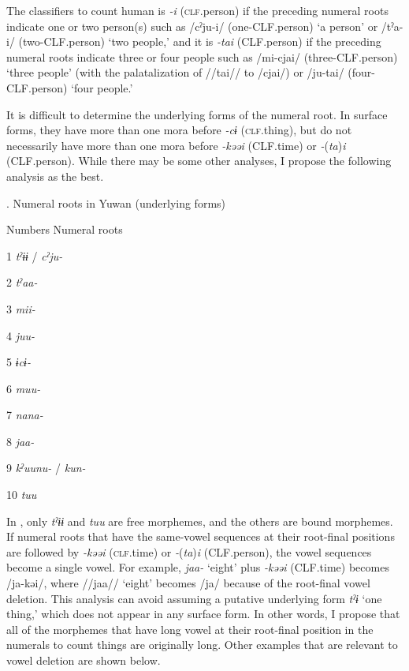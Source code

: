   The classifiers to count human is \textit{{}-i} (\textsc{clf}.person) if the preceding numeral roots indicate one or two person(s) such as /cˀju-i/ (one-CLF.person) ‘a person’ or /tˀa-i/ (two-CLF.person) ‘two people,’ and it is \textit{{}-tai} (CLF.person) if the preceding numeral roots indicate three or four people such as /mi-cjai/ (three-CLF.person) ‘three people’ (with the palatalization of //tai// to /cjai/) or /ju-tai/ (four-CLF.person) ‘four people.’

  It is difficult to determine the underlying forms of the numeral root. In surface forms, they have more than one mora before \textit{{}-cɨ} (\textsc{clf}.thing), but do not necessarily have more than one mora before \textit{{}-kəəi} (CLF.time) or \textit{{}-}(\textit{ta})\textit{i} (CLF.person). While there may be some other analyses, I propose the following analysis as the best.

\begin{styleBeschriftung}
\textmd{}\textmd{. Numeral roots in Yuwan (underlying forms)}
\end{styleBeschriftung}

Numbers  Numeral roots

1  \textit{tˀɨɨ} / \textit{cˀju-}

2  \textit{tˀaa-}

3  \textit{mii-}

4  \textit{juu-}

5  \textit{ɨcɨ-}

6  \textit{muu-}

7  \textit{nana-}

8  \textit{jaa-}

9  \textit{kˀuunu-} / \textit{kun-}

10  \textit{tuu}

\begin{styleBeschriftung}
\textmd{In , only} \textmd{\textit{tˀɨɨ}}\textmd{ and} \textmd{\textit{tuu}}\textmd{ are free morphemes, and the others are bound morphemes. If numeral roots that have the same-vowel sequences at their root-final positions are followed by} \textmd{\textit{{}-kəəi}}\textmd{ (\textsc{clf}.time) or} \textmd{\textit{{}-}}\textmd{(}\textmd{\textit{ta}}\textmd{)}\textmd{\textit{i} }\textmd{(CLF.person), the vowel sequences become a single vowel. For example,} \textmd{\textit{jaa-}}\textmd{ ‘eight’ plus} \textmd{\textit{{}-kəəi}}\textmd{ (CLF.time) becomes /ja-kəi/, where //jaa// ‘eight’ becomes /ja/ because of the root-final vowel deletion. This analysis} \textmd{can avoid assuming a putative underlying form} \textmd{\textit{tˀɨ}}\textmd{ ‘one thing,’ which does not appear in any surface form. In other words, I propose that all of the morphemes that have long vowel at their root-final position in the numerals to count things are originally long. Other examples that are relevant to vowel deletion are shown below.}
\end{styleBeschriftung}

